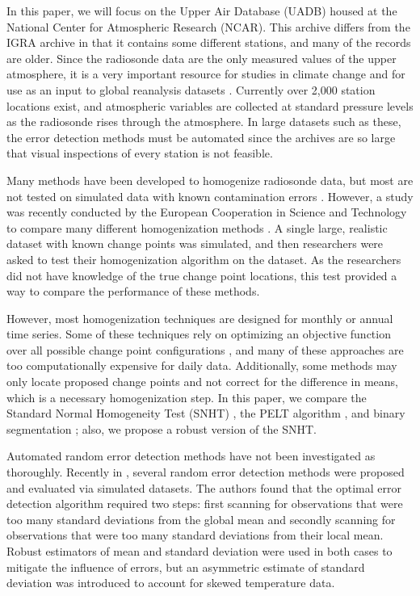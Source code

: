 \documentclass[12pt]{article}
\begin{document}
\begin{doublespacing}
In this paper, we will focus on the Upper Air Database (UADB) housed at the National Center for Atmospheric Research (NCAR). This archive differs from the IGRA archive in that it contains some different stations, and many of the records are older. Since the radiosonde data are the only measured values of the upper atmosphere, it is a very important resource for studies in climate change \cite{elliott91, eskridge95} and for use as an input to global reanalysis datasets \cite{kalnay96, kanamitsu02}. Currently over 2,000 station locations exist, and atmospheric variables are collected at standard pressure levels as the radiosonde rises through the atmosphere. In large datasets such as these, the error detection methods must be automated since the archives are so large that visual inspections of every station is not feasible.

Many methods have been developed to homogenize radiosonde data, but most are not tested on simulated data with known contamination errors \cite{eskridge95, haimberger07, lanzante96, lanzante03, venema12}.  However, a study was recently conducted by the European Cooperation in Science and Technology to compare many different homogenization methods \cite{venema12}.  A single large, realistic dataset with known change points was simulated, and then researchers were asked to test their homogenization algorithm on the dataset.  As the researchers did not have knowledge of the true change point locations, this test provided a way to compare the performance of  these  methods.  

However, most homogenization techniques are designed for monthly or annual time series.  Some of these techniques rely on optimizing an objective function over all possible change point configurations \cite{killick12, li14, lu10, scott74}, and many of these approaches are too computationally expensive for daily data.  Additionally, some methods may only locate proposed change points and not correct for the difference in means, which is a necessary homogenization step.  In this paper, we compare the Standard Normal Homogeneity Test (SNHT) \cite{alexandersson86}, the PELT algorithm \cite{killick12}, and binary segmentation \cite{scott74}; also, we propose a robust version of the SNHT.

Automated random error detection methods have not been investigated as thoroughly.  Recently in \cite{bell14}, several random error detection methods were proposed and evaluated via simulated datasets.  The authors found that the optimal error detection algorithm required two steps: first scanning for observations that were too many standard deviations from the global mean and secondly scanning for observations that were too many standard deviations from their local mean.  Robust estimators of mean and standard deviation were used in both cases to mitigate the influence of errors, but an asymmetric estimate of standard deviation was introduced to account for skewed temperature data.


\end{doublespacing}
\end{document}
